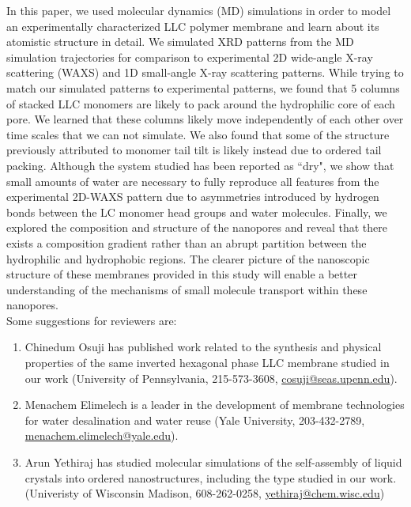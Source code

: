 \documentclass[fontsize=11pt]{article}
\begin{document}
	In this paper, we used molecular dynamics (MD) simulations in order to model an
	experimentally characterized LLC polymer membrane and learn about its atomistic
	structure in detail. We simulated XRD patterns from the MD simulation trajectories
	for comparison to experimental 2D wide-angle X-ray scattering (WAXS) and 1D 
	small-angle X-ray scattering patterns. While trying to match our simulated patterns
	to experimental patterns, we found that 5 columns of stacked LLC monomers are 
	likely to pack around the hydrophilic core of each pore. We learned that these 
	columns likely move independently of each other	over time scales that we can not
	simulate. We also found that some of the structure previously attributed to monomer
	tail tilt is likely instead due to ordered tail packing. Although the system studied
	has been reported as ``dry", we show that small amounts	of water are necessary to 
	fully reproduce all features from the experimental 2D-WAXS pattern due to asymmetries
	introduced by hydrogen bonds between the LC monomer head groups and water molecules.
	Finally, we explored the composition and structure of the nanopores and reveal that
	there exists a composition gradient rather than an abrupt partition between the 
	hydrophilic and hydrophobic regions. The clearer picture of the nanoscopic structure
	of these membranes provided in this study will enable a better understanding of the
	mechanisms of small molecule transport within these nanopores. \\
	
	\noindent Some suggestions for reviewers are:
	\begin{enumerate}
		\item Chinedum Osuji has published work related to the synthesis and physical
		properties of the same inverted hexagonal phase LLC membrane studied in our 
		work (University of Pennsylvania, 215-573-3608, 
		\href{mailto:cosuji@seas.upenn.edu}{cosuji@seas.upenn.edu}). 
		\item Menachem Elimelech is a leader in the development of membrane technologies
		for	water desalination and water reuse (Yale University, 203-432-2789, 
		\href{mailto:menachem.elimelech@yale.edu}{menachem.elimelech@yale.edu}).
		\item Arun Yethiraj has studied molecular simulations of the self-assembly
		of liquid crystals into ordered nanostructures, including the type studied
		in our work. (Univeristy of Wisconsin Madison, 608-262-0258, 
		\href{mailto:yethiraj@chem.wisc.edu}{yethiraj@chem.wisc.edu})  %
	\end{enumerate}
	
\end{document}
